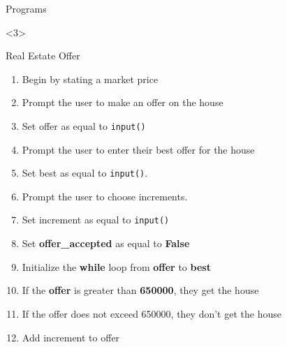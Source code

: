 \documentclass[../main.tex]{subfiles}
\begin{document}
\begin{frame}[fragile]{Programs}
  \begin{onlyenv}<3>
      \begin{exercise}{Real Estate Offer}
    \begin{enumerate} \justifying
    \item Begin by stating a market price
    \item Prompt the user to make an offer on the house
    \item  Set offer as equal to \texttt{input()}
    \item Prompt the user to enter their best offer for the house
    \item Set best as equal to \texttt{input()}.
    \item Prompt the user to choose increments.
    \item Set increment as equal to \texttt{input()}
    \item Set \textbf{offer_accepted} as equal to \textbf{False}
    \item Initialize the \textbf{while} loop from \textbf{offer} to \textbf{best}
    \item If the \textbf{offer} is greater than \textbf{650000}, they get the house
    \item If the offer does not exceed 650000, they don't get the house
    \item Add increment to offer
    \end{enumerate}
  \end{exercise}
  \end{onlyenv}
\end{frame}
\end{document}

